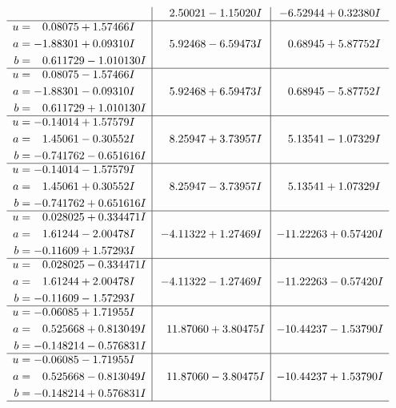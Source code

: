\documentclass[1p]{elsarticle_modified}
\theoremstyle{definition}
\begin{document}
$$\begin{array}{c|c|c}
 & \phantom{-}2.50021 - 1.15020 I & -6.52944 + 0.32380 I \\ \hline\begin{aligned}
u &= \phantom{-}0.08075 + 1.57466 I \\
a &= -1.88301 + 0.09310 I \\
b &= \phantom{-}0.611729 - 1.010130 I\end{aligned}
 & \phantom{-}5.92468 - 6.59473 I & \phantom{-}0.68945 + 5.87752 I \\ \hline\begin{aligned}
u &= \phantom{-}0.08075 - 1.57466 I \\
a &= -1.88301 - 0.09310 I \\
b &= \phantom{-}0.611729 + 1.010130 I\end{aligned}
 & \phantom{-}5.92468 + 6.59473 I & \phantom{-}0.68945 - 5.87752 I \\ \hline\begin{aligned}
u &= -0.14014 + 1.57579 I \\
a &= \phantom{-}1.45061 - 0.30552 I \\
b &= -0.741762 - 0.651616 I\end{aligned}
 & \phantom{-}8.25947 + 3.73957 I & \phantom{-}5.13541 - 1.07329 I \\ \hline\begin{aligned}
u &= -0.14014 - 1.57579 I \\
a &= \phantom{-}1.45061 + 0.30552 I \\
b &= -0.741762 + 0.651616 I\end{aligned}
 & \phantom{-}8.25947 - 3.73957 I & \phantom{-}5.13541 + 1.07329 I \\ \hline\begin{aligned}
u &= \phantom{-}0.028025 + 0.334471 I \\
a &= \phantom{-}1.61244 - 2.00478 I \\
b &= -0.11609 + 1.57293 I\end{aligned}
 & -4.11322 + 1.27469 I & -11.22263 + 0.57420 I \\ \hline\begin{aligned}
u &= \phantom{-}0.028025 - 0.334471 I \\
a &= \phantom{-}1.61244 + 2.00478 I \\
b &= -0.11609 - 1.57293 I\end{aligned}
 & -4.11322 - 1.27469 I & -11.22263 - 0.57420 I \\ \hline\begin{aligned}
u &= -0.06085 + 1.71955 I \\
a &= \phantom{-}0.525668 + 0.813049 I \\
b &= -0.148214 - 0.576831 I\end{aligned}
 & \phantom{-}11.87060 + 3.80475 I & -10.44237 - 1.53790 I \\ \hline\begin{aligned}
u &= -0.06085 - 1.71955 I \\
a &= \phantom{-}0.525668 - 0.813049 I \\
b &= -0.148214 + 0.576831 I\end{aligned}
 & \phantom{-}11.87060 - 3.80475 I & -10.44237 + 1.53790 I\\
 \hline 
 \end{array}$$\newpage
\end{document}
